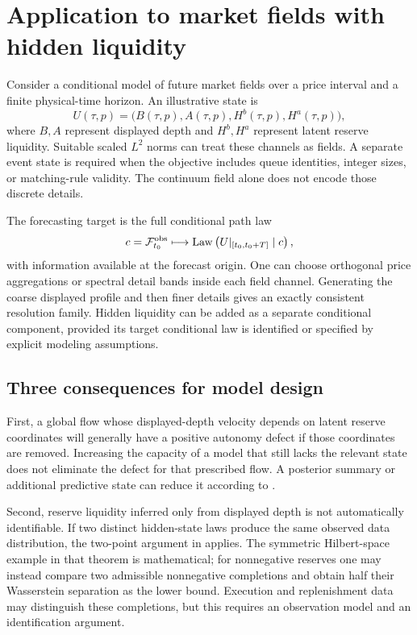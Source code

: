 \section{Application to market fields with hidden liquidity}\label{sec:application}
Consider a conditional model of future market fields over a price interval and a finite physical-time horizon. An illustrative state is
\begin{equation}
 U(\tau,p)=\bigl(B(\tau,p),A(\tau,p),H^b(\tau,p),H^a(\tau,p)\bigr),
\end{equation}
where $B,A$ represent displayed depth and $H^b,H^a$ represent latent reserve liquidity. Suitable scaled $L^2$ norms can treat these channels as fields. A separate event state is required when the objective includes queue identities, integer sizes, or matching-rule validity. The continuum field alone does not encode those discrete details.

The forecasting target is the full conditional path law
\begin{equation}
 c=\mathcal F_{t_0}^{\mathrm{obs}}
 \longmapsto\operatorname{Law}\left(U|_{[t_0,t_0+T]}\mid c\right),
\end{equation}
with information available at the forecast origin. One can choose orthogonal price aggregations or spectral detail bands inside each field channel. Generating the coarse displayed profile and then finer details gives an exactly consistent resolution family. Hidden liquidity can be added as a separate conditional component, provided its target conditional law is identified or specified by explicit modeling assumptions.

\subsection{Three consequences for model design}
First, a global flow whose displayed-depth velocity depends on latent reserve coordinates will generally have a positive autonomy defect if those coordinates are removed. Increasing the capacity of a model that still lacks the relevant state does not eliminate the defect for that prescribed flow. A posterior summary or additional predictive state can reduce it according to .

Second, reserve liquidity inferred only from displayed depth is not automatically identifiable. If two distinct hidden-state laws produce the same observed data distribution, the two-point argument in  applies. The symmetric Hilbert-space example in that theorem is mathematical; for nonnegative reserves one may instead compare two admissible nonnegative completions and obtain half their Wasserstein separation as the lower bound. Execution and replenishment data may distinguish these completions, but this requires an observation model and an identification argument.

